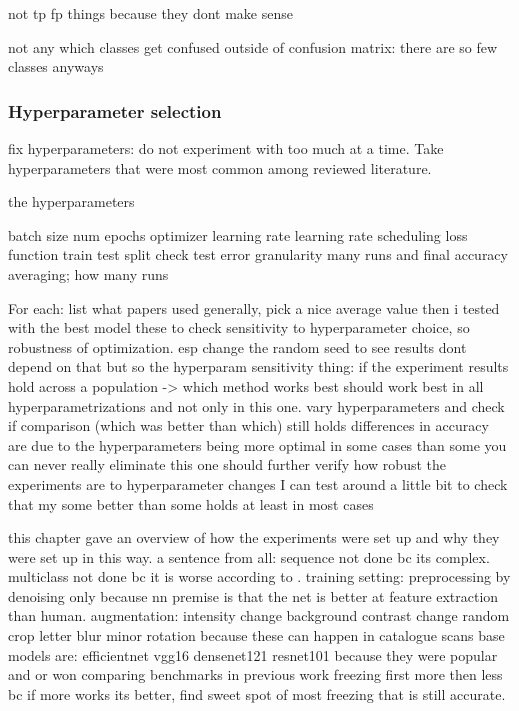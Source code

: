 \documentclass{article}
\begin{document}
not tp fp things because they dont make sense

not any which classes get confused outside of confusion matrix: there are so few classes anyways

\subsubsection{Hyperparameter selection}

fix hyperparameters: do not experiment with too much at a time.
Take hyperparameters that were most common among reviewed literature.

the hyperparameters

batch size 
num epochs 
optimizer 
learning rate 
learning rate scheduling
loss function
train test split
    check test error granularity
many runs and final accuracy averaging; how many runs

For each: list what papers used generally, pick a nice average value
then i tested with the best model these to check sensitivity to hyperparameter choice, so 
robustness of optimization. esp change the random seed to see results dont depend on that
    but so the hyperparam sensitivity thing:
        if the experiment results hold across a population -> which method works best should work best in all 
            hyperparametrizations and not only in this one. vary hyperparameters and check if comparison 
                (which was better than which) still holds
        differences in accuracy are due to the hyperparameters being more optimal in some cases than some 
            you can never really eliminate this 
            one should further verify how robust the experiments are to hyperparameter changes
            I can test around a little bit to check that my some better than some holds at least in most cases

this chapter gave an overview of how the experiments were set up and why they were set up in this way.
a sentence from all: sequence not done bc its complex. multiclass not done bc it is worse according to \cite{tibetan_ocr}.
training setting: preprocessing by denoising only because nn premise is that the net is better at feature extraction than human.
augmentation: intensity change background contrast change random crop letter blur minor rotation because these can happen in catalogue scans
base models are: efficientnet vgg16 densenet121 resnet101 because they were popular and or won comparing benchmarks in previous work
freezing first more then less bc if more works its better, find sweet spot of most freezing that is still accurate.
\end{document}

